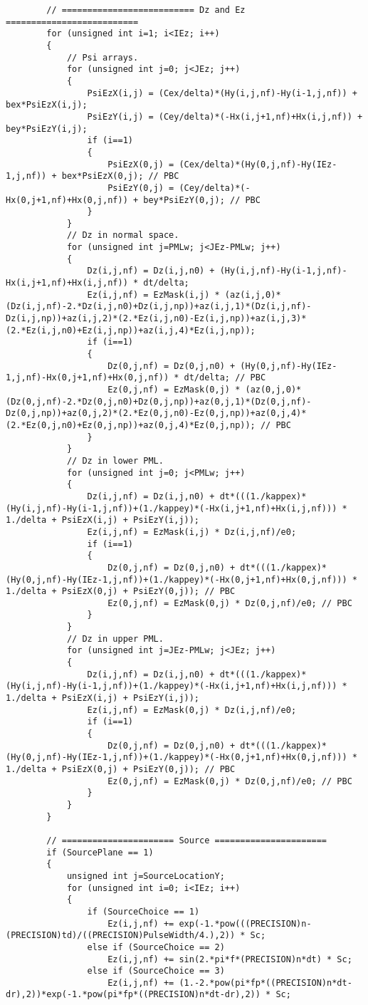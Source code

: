 \begin{lstlisting}
		// ========================== Dz and Ez ==========================
		for (unsigned int i=1; i<IEz; i++)
		{
			// Psi arrays.
			for (unsigned int j=0; j<JEz; j++)
			{
				PsiEzX(i,j) = (Cex/delta)*(Hy(i,j,nf)-Hy(i-1,j,nf)) + bex*PsiEzX(i,j);
				PsiEzY(i,j) = (Cey/delta)*(-Hx(i,j+1,nf)+Hx(i,j,nf)) + bey*PsiEzY(i,j);
				if (i==1)
				{
					PsiEzX(0,j) = (Cex/delta)*(Hy(0,j,nf)-Hy(IEz-1,j,nf)) + bex*PsiEzX(0,j); // PBC
					PsiEzY(0,j) = (Cey/delta)*(-Hx(0,j+1,nf)+Hx(0,j,nf)) + bey*PsiEzY(0,j); // PBC
				}
			}
			// Dz in normal space.
			for (unsigned int j=PMLw; j<JEz-PMLw; j++)
			{
				Dz(i,j,nf) = Dz(i,j,n0) + (Hy(i,j,nf)-Hy(i-1,j,nf)-Hx(i,j+1,nf)+Hx(i,j,nf)) * dt/delta;
				Ez(i,j,nf) = EzMask(i,j) * (az(i,j,0)*(Dz(i,j,nf)-2.*Dz(i,j,n0)+Dz(i,j,np))+az(i,j,1)*(Dz(i,j,nf)-Dz(i,j,np))+az(i,j,2)*(2.*Ez(i,j,n0)-Ez(i,j,np))+az(i,j,3)*(2.*Ez(i,j,n0)+Ez(i,j,np))+az(i,j,4)*Ez(i,j,np));
				if (i==1)
				{
					Dz(0,j,nf) = Dz(0,j,n0) + (Hy(0,j,nf)-Hy(IEz-1,j,nf)-Hx(0,j+1,nf)+Hx(0,j,nf)) * dt/delta; // PBC
					Ez(0,j,nf) = EzMask(0,j) * (az(0,j,0)*(Dz(0,j,nf)-2.*Dz(0,j,n0)+Dz(0,j,np))+az(0,j,1)*(Dz(0,j,nf)-Dz(0,j,np))+az(0,j,2)*(2.*Ez(0,j,n0)-Ez(0,j,np))+az(0,j,4)*(2.*Ez(0,j,n0)+Ez(0,j,np))+az(0,j,4)*Ez(0,j,np)); // PBC
				}
			}
			// Dz in lower PML.
			for (unsigned int j=0; j<PMLw; j++)
			{
				Dz(i,j,nf) = Dz(i,j,n0) + dt*(((1./kappex)*(Hy(i,j,nf)-Hy(i-1,j,nf))+(1./kappey)*(-Hx(i,j+1,nf)+Hx(i,j,nf))) * 1./delta + PsiEzX(i,j) + PsiEzY(i,j));
				Ez(i,j,nf) = EzMask(i,j) * Dz(i,j,nf)/e0;
				if (i==1)
				{
					Dz(0,j,nf) = Dz(0,j,n0) + dt*(((1./kappex)*(Hy(0,j,nf)-Hy(IEz-1,j,nf))+(1./kappey)*(-Hx(0,j+1,nf)+Hx(0,j,nf))) * 1./delta + PsiEzX(0,j) + PsiEzY(0,j)); // PBC
					Ez(0,j,nf) = EzMask(0,j) * Dz(0,j,nf)/e0; // PBC
				}
			}
			// Dz in upper PML.
			for (unsigned int j=JEz-PMLw; j<JEz; j++)
			{
				Dz(i,j,nf) = Dz(i,j,n0) + dt*(((1./kappex)*(Hy(i,j,nf)-Hy(i-1,j,nf))+(1./kappey)*(-Hx(i,j+1,nf)+Hx(i,j,nf))) * 1./delta + PsiEzX(i,j) + PsiEzY(i,j));
				Ez(i,j,nf) = EzMask(0,j) * Dz(i,j,nf)/e0;
				if (i==1)
				{
					Dz(0,j,nf) = Dz(0,j,n0) + dt*(((1./kappex)*(Hy(0,j,nf)-Hy(IEz-1,j,nf))+(1./kappey)*(-Hx(0,j+1,nf)+Hx(0,j,nf))) * 1./delta + PsiEzX(0,j) + PsiEzY(0,j)); // PBC
					Ez(0,j,nf) = EzMask(0,j) * Dz(0,j,nf)/e0; // PBC
				}
			}
		}

		// ====================== Source ======================
		if (SourcePlane == 1)
		{
			unsigned int j=SourceLocationY;
			for (unsigned int i=0; i<IEz; i++)
			{
				if (SourceChoice == 1)
					Ez(i,j,nf) += exp(-1.*pow(((PRECISION)n-(PRECISION)td)/((PRECISION)PulseWidth/4.),2)) * Sc;
				else if (SourceChoice == 2)
					Ez(i,j,nf) += sin(2.*pi*f*(PRECISION)n*dt) * Sc;
				else if (SourceChoice == 3)
					Ez(i,j,nf) += (1.-2.*pow(pi*fp*((PRECISION)n*dt-dr),2))*exp(-1.*pow(pi*fp*((PRECISION)n*dt-dr),2)) * Sc;


\end{lstlisting}
